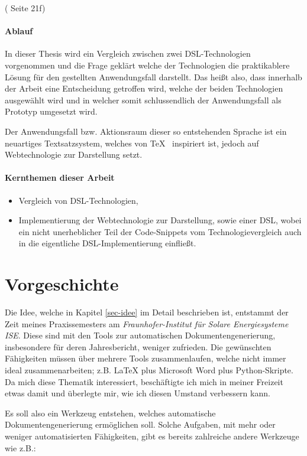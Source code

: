 (\cite{dsls} Seite 21f)

\paragraph{Ablauf}\label{par-ablauf}

In dieser Thesis wird ein Vergleich zwischen zwei DSL-Technologien vorgenommen
und die Frage geklärt welche der Technologien die praktikablere Lösung für
den gestellten Anwendungsfall darstellt.
Das heißt also, dass innerhalb der Arbeit eine Entscheidung getroffen wird,
welche der beiden Technologien ausgewählt wird und in welcher somit
schlussendlich der Anwendungsfall als Prototyp umgesetzt wird.

Der Anwendungsfall bzw. Aktionsraum dieser so entstehenden Sprache ist ein
neuartiges Textsatzsystem, welches von \TeX~ inspiriert ist, jedoch auf
Webtechnologie zur Darstellung setzt.

\paragraph{Kernthemen dieser Arbeit}

\begin{itemize}
  \item Vergleich von DSL-Technologien,
  \item Implementierung der Webtechnologie zur Darstellung, sowie einer DSL,
        wobei ein nicht unerheblicher Teil der Code-Snippets vom Technologievergleich
        auch in die eigentliche DSL-Implementierung einfließt.
\end{itemize}

\section{Vorgeschichte}

Die Idee, welche in Kapitel \ref{sec-idee} im Detail beschrieben ist,
entstammt der Zeit meines Praxissemesters am
\emph{Fraunhofer-Institut für Solare Energiesysteme ISE}.
Diese sind mit den Tools zur automatischen Dokumentengenerierung, insbesondere
für deren Jahresbericht, weniger zufrieden. Die gewünschten
Fähigkeiten müssen über mehrere Tools zusammenlaufen, welche nicht immer
ideal zusammenarbeiten; z.B. LaTeX plus Microsoft Word plus Python-Skripte.
Da mich diese Thematik interessiert, beschäftigte ich mich in meiner Freizeit
etwas damit und überlegte mir, wie ich diesen Umstand verbessern kann.

Es soll also ein Werkzeug entstehen, welches automatische
Dokumentengenerierung ermöglichen soll. Solche Aufgaben,
mit mehr oder weniger automatisierten Fähigkeiten,
gibt es bereits zahlreiche andere Werkzeuge wie z.B.:

